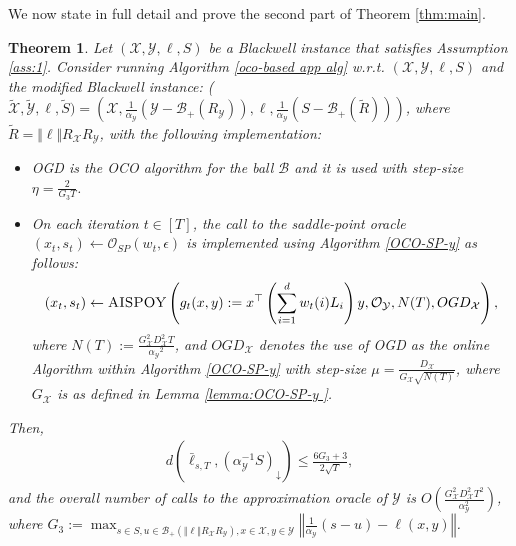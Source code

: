 \documentclass[a4paper,12pt]{article}
\newtheorem{theorem} {Theorem}
\newcommand{\mY}{\mathcal{Y}}
\newcommand{\mX}{\mathcal{X}}
\newcommand{\mB}{\mathcal{B}}
\newcommand{\oraclesp}{\mathcal{O}_{SP}}
\newcommand{\oracley}{\mathcal{O}_{\mY}}
\begin{document}
We  now state in full detail and prove the second part of Theorem \ref{thm:main}.
\begin{theorem}\label{theorem:app on y}
Let $(\mX,\mY,\ell,S)$ be a Blackwell instance that satisfies Assumption \ref{ass:1}. Consider running Algorithm \ref{oco-based app  alg} w.r.t. $(\mX,\mY,\ell,S)$ and the modified Blackwell instance:
($\tilde{\mX}, \tilde{\mY}, \ell, \tilde{S}) = \left({\mX, \frac{1}{\alpha_{\mY}}(\mY-\mB_+(R_{\mY})), \ell, \frac{1}{\alpha_{\mY}}(S-\mB_{+}(\tilde{R}))}\right)$,
where  $\tilde{R}=\Vert \ell \Vert R_\mX R_\mY$, with the following implementation:
\begin{itemize}
\item
OGD is the OCO algorithm for the ball $\mB$ and it is used with step-size $\eta= \frac{2}{G_3 T}$.
\item
On each iteration $t\in[T]$, the call to the saddle-point oracle $(x_t,s_t)\gets \oraclesp(w_t, \epsilon)$ is implemented using Algorithm \ref{OCO-SP-y} as follows:
\begin{align*}
\left(x_t , s_t \right) \gets \textsc{AISPOY}  \left( g_t(x,y) :=x^\top \left( \sum_{i=1}^d {w_t}(i)L_i \right) y, \oracley, N(T) , OGD_{\mX}  \right),
\end{align*}
where $N(T):=\frac{G_{\mX}^2 D_{\mX}^2 T}{{\alpha_{\mY}}^2}$, and $OGD_{\mX}$ denotes the use of OGD as the online Algorithm within Algorithm  \ref{OCO-SP-y}  with step-size $\mu= \frac{D_{\mX}}{G_{\mX} \sqrt{N(T)}}$, where $G_{\mX}$ is as defined in Lemma \ref{lemma:OCO-SP-y }.
\end{itemize}
Then, 
\begin{align}\label{eq:s_t conv y}
d\left(\bar{\ell}_{s,T} , {\left(\alpha_{\mY}^{-1}S\right)}_{\downarrow}\right) \leq \frac{6G_3+3}{2\sqrt{T}},
\end{align}
and the overall number of calls to the approximation oracle of $\mY$  is $O\left({ \frac{G_{\mX}^2 D_{\mX}^2 T^2}{\alpha_{\mY}^2}}\right)$, where %
$G_3:=\max_{s\in S,u \in \mB_+(\Vert \ell \Vert R_\mX R_\mY),x \in \mX ,y \in \mY} \left\Vert\frac{1}{\alpha_{\mY}}(s- u) - \ell (x,y)\right\Vert$.
\end{theorem}
\end{document}
